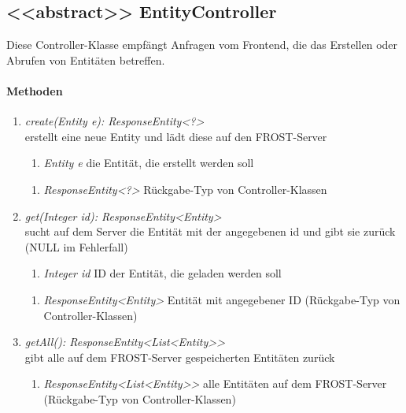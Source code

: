 \subsection{<{<{abstract}>}> EntityController}
Diese Controller-Klasse empfängt Anfragen vom Frontend, die das Erstellen oder Abrufen von Entitäten betreffen.

\paragraph{Methoden}

\begin{enumerate}[+]
	\item \textit{ create(Entity e): ResponseEntity<?> }\\
	erstellt eine neue Entity und lädt diese auf den FROST-Server
	
		\begin{enumerate}[$\bullet$]
			\item \textit{Entity e} die Entität, die erstellt werden soll

		\end{enumerate}
		\vspace{-0.2cm}
		\begin{enumerate}[$\circ$]
			\item \textit{ResponseEntity<?>} Rückgabe-Typ von Controller-Klassen
		\end{enumerate}
	
	\item \textit{ get(Integer id): ResponseEntity<Entity> }\\
	sucht auf dem Server die Entität mit der angegebenen id und gibt sie zurück (NULL im Fehlerfall)
	
		\begin{enumerate}[$\bullet$]
			\item \textit{Integer id} ID der Entität, die geladen werden soll
		
		\end{enumerate}
		\vspace{-0.2cm}
		\begin{enumerate}[$\circ$]
			\item \textit{ResponseEntity<Entity>} Entität mit angegebener ID (Rückgabe-Typ von Controller-Klassen)
		\end{enumerate}
	\item \textit{ getAll(): ResponseEntity<List<Entity>> }\\
	gibt alle auf dem FROST-Server gespeicherten Entitäten zurück
	
	\begin{enumerate}[$\circ$]
		\item \textit{ResponseEntity<List<Entity>>} alle Entitäten auf dem FROST-Server (Rückgabe-Typ von Controller-Klassen)
	\end{enumerate}


\end{enumerate}	
